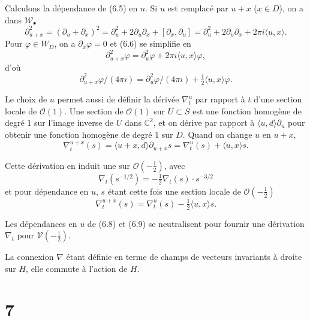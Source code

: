 \documentclass[12pt,a4paper]{article}
\theoremstyle{plain}
\theoremstyle{definition}
\theoremstyle{remark}
\begin{document}
Calculons la dépendance de (6.5) en $u$. Si $u$ est remplacé par $u + x$ ($x \in D$), on a dans $\mathscr{W}_\bullet$
\begin{equation}\label{eq:6.6}
\partial_{u+x}^2 = (\partial_u + \partial_x)^2 = \partial_u^2 + 2\partial_u\partial_x + [\partial_x, \partial_u] = \partial_u^2 + 2\partial_u\partial_x + 2\pi i\langle u, x \rangle.\tag{6.6}
\end{equation}
Pour $\varphi \in W_D$, on a $\partial_x\varphi = 0$ et (6.6) se simplifie en
\begin{equation}\label{eq:6.7}
\partial_{u+x}^2\varphi = \partial_u^2\varphi + 2\pi i\langle u, x \rangle\varphi,\tag{6.7}
\end{equation}
d'où
\begin{equation}\label{eq:6.8}
\partial_{u+x}^2\varphi/(4\pi i) = \partial_u^2\varphi/(4\pi i) + \tfrac{1}{2}\langle u, x \rangle\varphi.\tag{6.8}
\end{equation}

Le choix de $u$ permet aussi de définir la dérivée $\nabla_t^u$ par rapport à $t$ d'une section locale de $\mathcal{O}(1)$. Une section de $\mathcal{O}(1)$ sur $U \subset S$ est une fonction homogène de degré $1$ sur l'image inverse de $U$ dans $\mathbb{C}^2$, et on dérive par rapport à $\langle u, d \rangle\partial_u$ pour obtenir une fonction homogène de degré $1$ sur $D$. Quand on change $u$ en $u + x$,
\[\nabla_t^{u+x}(s) = \langle u + x, d \rangle\partial_{u+x}s = \nabla_t^u(s) + \langle u, x \rangle s.\]

Cette dérivation en induit une sur $\mathcal{O}(-\frac{1}{2})$, avec
\[\nabla_t(s^{-1/2}) = -\tfrac{1}{2}\nabla_t(s) \cdot s^{-3/2}\]
et pour dépendance en $u$, $s$ étant cette fois une section locale de $\mathcal{O}(-\frac{1}{2})$
\begin{equation}\label{eq:6.9}
\nabla_t^{u+x}(s) = \nabla_t^u(s) - \tfrac{1}{2}\langle u, x \rangle s.\tag{6.9}
\end{equation}

Les dépendances en $u$ de (6.8) et (6.9) se neutralisent pour fournir une dérivation $\nabla_t$ pour $\mathscr{V}(-\frac{1}{2})$.

La connexion $\nabla$ étant définie en terme de champs de vecteurs invariants à droite sur $H$, elle commute à l'action de $H$.

\section*{7}
\end{document}
